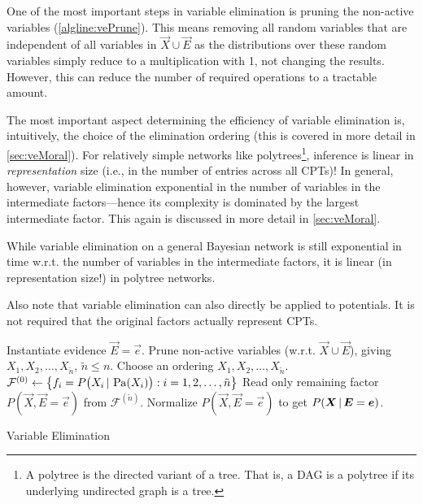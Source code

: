 		One of the most important steps in variable elimination is pruning the non-active variables (\autoref{algline:vePrune}). This means removing all random variables that are independent of all variables in \( \vec{X} \cup \vec{E} \) as the distributions over these random variables simply reduce to a multiplication with \num{1}, not changing the results. However, this can reduce the number of required operations to a tractable amount.

		The most important aspect determining the efficiency of variable elimination is, intuitively, the choice of the elimination ordering (this is covered in more detail in \autoref{sec:veMoral}). For relatively simple networks like polytrees\footnote{A polytree is the directed variant of a tree. That is, a DAG is a polytree if its underlying undirected graph is a tree.}, inference is linear in \emph{representation} size (i.e., in the number of entries across all CPTs)! In general, however, variable elimination exponential in the number of variables in the intermediate factors---hence its complexity is dominated by the largest intermediate factor. This again is discussed in more detail in \autoref{sec:veMoral}.

		While variable elimination on a general Bayesian network is still exponential in time w.r.t. the number of variables in the intermediate factors, it is linear (in representation size!) in polytree networks.

		Also note that variable elimination can also directly be applied to potentials. It is not required that the original factors actually represent CPTs.

		\begin{algorithm}  \DontPrintSemicolon
			Instantiate evidence \( \vec{E} = \vec{e} \). \;
			Prune non-active variables (w.r.t. \( \vec{X} \cup \vec{E} \)), giving \( X_1, X_2, \dots, X_{\tilde{n}} \), \( \tilde{n} \leq n \).  \label{algline:vePrune} \;
			Choose an ordering \( X_1, X_2, \dots, X_{\tilde{n}} \). \;
			\( \mathcal{F}^{(0)} \gets \bigl\{ f_i = P\bigl( X_i \,\vert\, \operatorname{Pa}(X_i) \bigr) : i = 1, 2, \dots, \tilde{n} \bigr\} \) \;
			Read only remaining factor \( P(\vec{X}, \vec{E} = \vec{e}) \) from \( \mathcal{F}^{(\tilde{n})} \). \;
			Normalize \( P(\vec{X}, \vec{E} = \vec{e}) \) to get \( P(\bm{X} \,\vert\, \bm{E} = \bm{e}) \). \;
			\caption{Variable Elimination}
			\label{alg:variableElimination}
		\end{algorithm}


